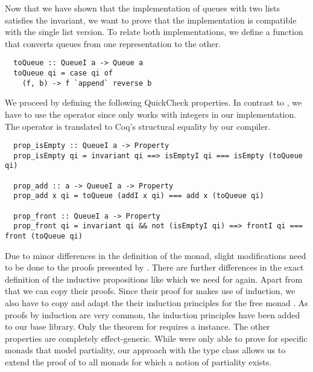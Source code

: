 Now that we have shown that the implementation of queues with two lists satisfies the invariant, we want to prove that the implementation is compatible with the single list version.
To relate both implementations, we define a function that converts queues from one representation to the other.
\begin{verbatim}
  toQueue :: QueueI a -> Queue a
  toQueue qi = case qi of
    (f, b) -> f `append` reverse b
\end{verbatim}
We proceed by defining the following QuickCheck properties.
In contrast to \cite{Dylus:2018}, we have to use the \haskell{(===)} operator since \haskell{(==)} only works with integers in our implementation.
The \haskell{(===)} operator is translated to Coq's structural equality by our compiler.
\begin{verbatim}
  prop_isEmpty :: QueueI a -> Property
  prop_isEmpty qi = invariant qi ==> isEmptyI qi === isEmpty (toQueue qi)

  prop_add :: a -> QueueI a -> Property
  prop_add x qi = toQueue (addI x qi) === add x (toQueue qi)

  prop_front :: QueueI a -> Property
  prop_front qi = invariant qi && not (isEmptyI qi) ==> frontI qi === front (toQueue qi)
\end{verbatim}
Due to minor differences in the definition of the  monad, slight modifications need to be done to the proofs presented by \cite{Dylus:2018}.
There are further differences in the exact definition of the inductive propositions like  which we need for  again.
Apart from that we can copy their proofs.
Since their proof for  makes use of induction, we also have to copy and adapt the their induction principles for the free monad \cite[pp.~29-31]{Dylus:2018}.
As proofs by induction are very common, the induction principles have been added to our base library.
Only the theorem for  requires a  instance.
The other properties are completely effect-generic.
While \cite{Dylus:2018} were only able to prove  for specific monads that model partiality, our approach with the  type class allows us to extend the proof of  to all monads for which a notion of partiality exists.
